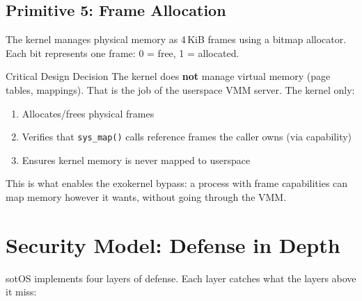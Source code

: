 \documentclass[11pt,a4paper]{article}
\begin{document}
\subsection{Primitive 5: Frame Allocation}

The kernel manages physical memory as 4\,KiB frames using a bitmap allocator.
Each bit represents one frame: 0 = free, 1 = allocated.

\begin{warningbox}{Critical Design Decision}
The kernel does \textbf{not} manage virtual memory (page tables, mappings).
That is the job of the userspace VMM server. The kernel only:
\begin{enumerate}[leftmargin=1.5em]
  \item Allocates/frees physical frames
  \item Verifies that \texttt{sys\_map()} calls reference frames the caller owns (via capability)
  \item Ensures kernel memory is never mapped to userspace
\end{enumerate}
This is what enables the exokernel bypass: a process with frame capabilities
can map memory however it wants, without going through the VMM.
\end{warningbox}

\section{Security Model: Defense in Depth}

sotOS implements four layers of defense. Each layer catches what the layers
above it miss:
\end{document}
